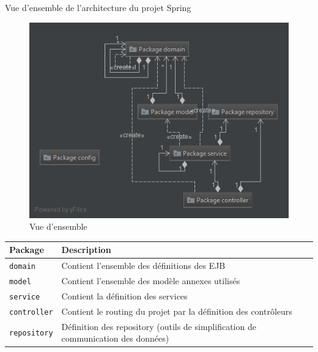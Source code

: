 \documentclass[a4paper]{article}
\makeatletter
\renewcommand{\section}{\@startsection{section}{1}{\z@}
{-4ex \@plus -1ex \@minus -.4ex}
{1ex \@plus.2ex }
{\normalfont\large\sffamily\bfseries}}
\renewcommand{\arraystretch}{1.5}
\makeatother
\begin{document}
\newpage

\vspace*{0.5cm}

\section{Vue d'ensemble de l'architecture du projet Spring}
\begin{figure}[h]
\centering
\includegraphics[scale=.8]{diag_architecture.png}
\caption{Vue d'ensemble}
\end{figure}

\begin{table}[h]
	\centering
	\def\arraystretch{1.4}
	\begin{tabular}{|l|l|l|}
		\hline
		\textbf{Package} & \textbf{Description}\\
		\hline
		\texttt{domain} & Contient l'ensemble des définitions des EJB\\
	  \hline
		\texttt{model} & Contient l'ensemble des modèle annexes utilisés\\
	  \hline
		\texttt{service} & Contient la définition des services\\
	  \hline
		\texttt{controller} & Contient le routing du projet par la définition des contrôleurs\\
	  \hline
		\texttt{repository} & Définition des repository (outils de simplification de communication des données)\\
	  \hline
	\end{tabular}
\end{table}
\end{document}
